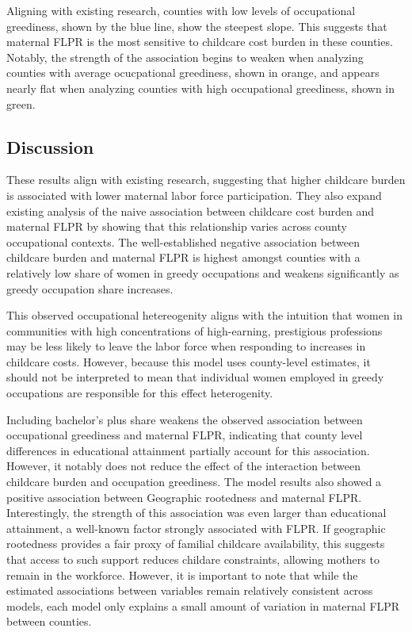 \documentclass[
  letterpaper,
  DIV=11,
  numbers=noendperiod]{scrartcl}
\begin{document}
Aligning with existing research, counties with low levels of
occupational greediness, shown by the blue line, show the steepest
slope. This suggests that maternal FLPR is the most sensitive to
childcare cost burden in these counties. Notably, the strength of the
association begins to weaken when analyzing counties with average
ocucpational greediness, shown in orange, and appears nearly flat when
analyzing counties with high occupational greediness, shown in green.

\subsection{Discussion}\label{discussion}

These results align with existing research, suggesting that higher
childcare burden is associated with lower maternal labor force
participation. They also expand existing analysis of the naive
association between childcare cost burden and maternal FLPR by showing
that this relationship varies across county occupational contexts. The
well-established negative association between childcare burden and
maternal FLPR is highest amongst counties with a relatively low share of
women in greedy occupations and weakens significantly as greedy
occupation share increases.

This observed occupational hetereogenity aligns with the intuition that
women in communities with high concentrations of high-earning,
prestigious professions may be less likely to leave the labor force when
responding to increases in childcare costs. However, because this model
uses county-level estimates, it should not be interpreted to mean that
individual women employed in greedy occupations are responsible for this
effect heterogenity.

Including bachelor's plus share weakens the observed association between
occupational greediness and maternal FLPR, indicating that county level
differences in educational attainment partially account for this
association. However, it notably does not reduce the effect of the
interaction between childcare burden and occupation greediness. The
model results also showed a positive association between Geographic
rootedness and maternal FLPR. Interestingly, the strength of this
association was even larger than educational attainment, a well-known
factor strongly associated with FLPR. If geographic rootedness provides
a fair proxy of familial childcare availability, this suggests that
access to such support reduces childare constraints, allowing mothers to
remain in the workforce. However, it is important to note that while the
estimated associations between variables remain relatively consistent
across models, each model only explains a small amount of variation in
maternal FLPR between counties.
\end{document}
